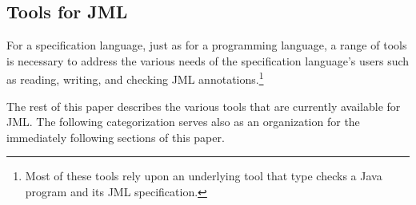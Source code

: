 \subsection{Tools for JML}
\label{tools}

For a specification language, just as for a programming language, a
range of tools is necessary to address the various needs of the
specification language's users such as reading, writing, and checking
JML annotations.\footnote{Most of these tools rely upon an underlying
  tool that type checks a Java program and its JML specification.}



The rest of this paper describes the various tools that are currently
available for JML.  The following categorization serves also as an
organization for the immediately following sections of this paper.

\smallskip

